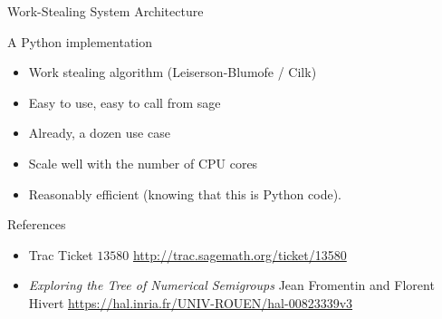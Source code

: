 \documentclass{beamer}
\begin{document}


\begin{frame}{Work-Stealing System Architecture}
  
  \begin{block}{A Python implementation}
    \begin{itemize}
    \item Work stealing algorithm (Leiserson-Blumofe / Cilk)
    \item Easy to use, easy to call from sage
    \item Already, a dozen  use case
    \item Scale well with the number of CPU cores
    \item Reasonably efficient (knowing that this is Python code).
    \end{itemize}
  \end{block}

  \begin{block}{References}
\begin{itemize}  \item Trac Ticket $13580$ \url{http://trac.sagemath.org/ticket/13580}
    \bigskip
    
  \item \textit{Exploring the Tree of Numerical Semigroups} Jean Fromentin
    and Florent Hivert \url{https://hal.inria.fr/UNIV-ROUEN/hal-00823339v3}
\end{itemize}
  \end{block}
\end{frame}
\end{document}
